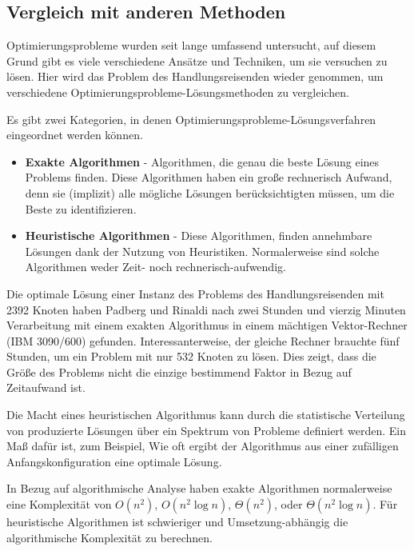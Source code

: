 \documentclass[twoside,twocolumn]{article}
\begin{document}
\subsection{Vergleich mit anderen Methoden}
Optimierungsprobleme wurden seit lange umfassend untersucht, auf diesem Grund gibt es viele verschiedene Ansätze und Techniken, um sie versuchen zu lösen. Hier wird das Problem des Handlungsreisenden wieder genommen, um verschiedene Optimierungsprobleme-Lösungsmethoden zu vergleichen.\par
Es gibt zwei Kategorien, in denen Optimierungsprobleme-Lösungsverfahren eingeordnet werden können.
\begin{itemize}
\item{\textbf{Exakte Algorithmen} - Algorithmen, die genau die beste Lösung eines Problems finden. Diese Algorithmen haben ein große rechnerisch Aufwand, denn sie (implizit) alle mögliche Lösungen berücksichtigten müssen, um die Beste zu identifizieren.}
\item{\textbf{Heuristische Algorithmen} - Diese Algorithmen, finden annehmbare Lösungen dank der Nutzung von Heuristiken. Normalerweise sind solche Algorithmen weder Zeit- noch rechnerisch-aufwendig.}
\end{itemize}

Die optimale Lösung einer Instanz des Problems des Handlungsreisenden mit 2392 Knoten haben Padberg und Rinaldi \cite{exact_algorithms_A} \cite{exact_algorithms_B} nach zwei Stunden und vierzig Minuten Verarbeitung mit einem exakten Algorithmus in einem mächtigen Vektor-Rechner (IBM 3090/600) gefunden. Interessanterweise, der gleiche Rechner brauchte fünf Stunden, um ein Problem mit nur 532 Knoten zu lösen. Dies zeigt, dass die Größe des Problems nicht die einzige bestimmend Faktor in Bezug auf Zeitaufwand ist.\par

Die Macht eines heuristischen Algorithmus kann durch die statistische Verteilung von produzierte Lösungen über ein Spektrum von Probleme definiert werden. Ein Maß dafür ist, zum Beispiel, Wie oft ergibt der Algorithmus aus einer zufälligen Anfangskonfiguration eine optimale Lösung.\par

In Bezug auf algorithmische Analyse haben exakte Algorithmen normalerweise eine Komplexität von $O(n^2)$, $O(n^2\log n)$, $\Theta(n^2)$, oder $\Theta(n^2\log n)$. Für heuristische Algorithmen ist schwieriger und Umsetzung-abhängig die algorithmische Komplexität zu berechnen.\par
\end{document}
